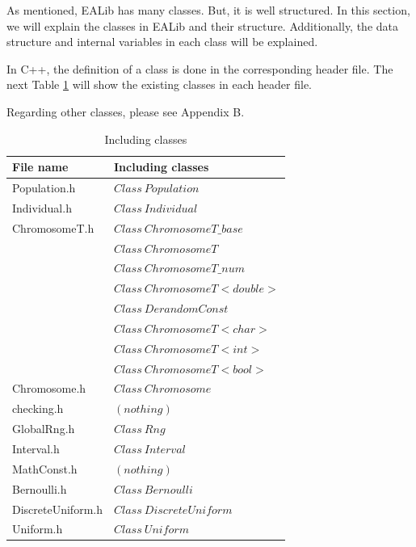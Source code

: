\documentclass[twocolumn]{article}
\begin{document}
\noindent
As mentioned, EALib has many classes. But, it is well structured. In
this section, we will explain the classes in EALib and their
structure. Additionally, the data structure and internal variables in each
class will be explained.

\noindent
In C++, the definition of a class is done in the corresponding
header file. The next Table \ref{IncludeClass} will show the existing
classes in each header file. 

\noindent
Regarding other classes, please see Appendix B.

\begin{table}[h]
\begin{center}
\caption{Including classes}
\label{IncludeClass}
{\footnotesize
\begin{tabular}{|l|l|}\hline
File name         & Including classes             \\\hline\hline 
Population.h      & $Class \ Population         $ \\\hline
Individual.h      & $Class \ Individual         $ \\\hline
ChromosomeT.h     & $Class \ ChromosomeT\_base  $ \\
                  & $Class \ ChromosomeT        $ \\
                  & $Class \ ChromosomeT\_num   $ \\
                  & $Class \ ChromosomeT<double>$ \\
                  & $Class \ DerandomConst      $ \\
                  & $Class \ ChromosomeT<char>  $ \\
                  & $Class \ ChromosomeT<int>   $ \\
                  & $Class \ ChromosomeT<bool>  $ \\\hline
Chromosome.h      & $Class \ Chromosome         $ \\\hline
checking.h        & $(nothing)                  $ \\\hline
GlobalRng.h       & $Class \ Rng                $ \\\hline
Interval.h        & $Class \ Interval           $ \\\hline
MathConst.h       & $(nothing)                  $ \\\hline
Bernoulli.h       & $Class \ Bernoulli          $ \\\hline
DiscreteUniform.h & $Class \ DiscreteUniform    $ \\\hline
Uniform.h         & $Class \ Uniform            $ \\\hline

\end{tabular}}
\end{center}
\end{table}
\end{document}
